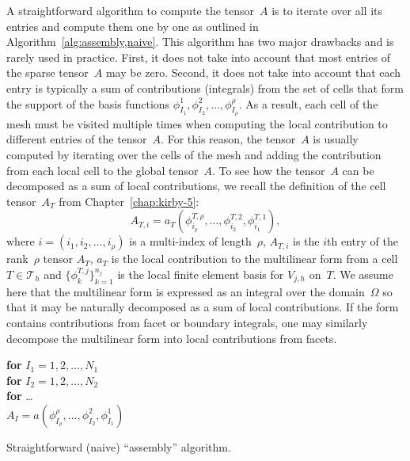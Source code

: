 A straightforward algorithm to compute the tensor~$A$ is to iterate
over all its entries and compute them one by one as outlined in
Algorithm~\ref{alg:assembly,naive}. This algorithm has two major
drawbacks and is rarely used in practice. First, it does not take into
account that most entries of the sparse tensor~$A$ may be
zero. Second, it does not take into account that each entry is
typically a sum of contributions (integrals) from the set of cells
that form the support of the basis functions $\phi^1_{I_1},
\phi^2_{I_2}, \ldots, \phi^{\rho}_{I_\rho}$. As a result, each cell of
the mesh must be visited multiple times when computing the local
contribution to different entries of the tensor~$A$.  For this reason,
the tensor~$A$ is usually computed by iterating over the cells of the
mesh and adding the contribution from each local cell to the global
tensor~$A$. To see how the tensor~$A$ can be decomposed as a sum of
local contributions, we recall the definition of the cell tensor~$A_T$
from Chapter~\ref{chap:kirby-5}:
\begin{equation}
  A_{T,i} = a_T(\phi^{T,\rho}_{i_{\rho}}, \ldots, \phi^{T,2}_{i_2},
  \phi^{T,1}_{i_1}),
\end{equation}
where $i = (i_1, i_2, \ldots, i_{\rho})$ is a multi-index of
length~$\rho$, $A_{T,i}$ is the $i$th entry of the rank~$\rho$ tensor
$A_T$, $a_T$ is the local contribution to the multilinear form from a
cell~$T\in\mathcal{T}_h$ and $\{\phi^{T,j}_k\}_{k=1}^{n_j}$ is the
local finite element basis for $V_{j,h}$ on~$T$. We assume here that
the multilinear form is expressed as an integral over the
domain~$\Omega$ so that it may be naturally decomposed as a sum of
local contributions. If the form contains contributions from facet or
boundary integrals, one may similarly decompose the multilinear form
into local contributions from facets.

\begin{algorithm}
  \begin{tabbing}
    \textbf{for} {$I_1 = 1,2,\ldots,N_1$}\\
    \tab \textbf{for} {$I_2 = 1,2,\ldots,N_2$}\\
    \tab \tab \textbf{for} \ldots \\
    \tab \tab \tab $A_I = a(\phi^{\rho}_{I_{\rho}}, \ldots, \phi^2_{I_2}, \phi^1_{I_1})$
  \end{tabbing}
  \caption{Straightforward (naive) ``assembly'' algorithm.}
  \label{alg:assembly,naive}
\end{algorithm}

